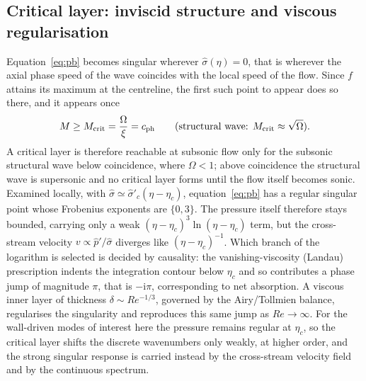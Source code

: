 \documentclass[11pt]{article}
\newcommand{\Om}{\Omega}
\begin{document}
\subsection{Critical layer: inviscid structure and viscous regularisation}
Equation~\eqref{eq:pb} becomes singular wherever $\hat\sigma(\eta)=0$, that is wherever the axial phase
speed of the wave coincides with the local speed of the flow. Since $f$ attains its maximum at the
centreline, the first such point to appear does so there, and it appears once
\begin{equation}
M\ge M_{\rm crit}=\frac{\Om}{\xi}=c_{\rm ph}\qquad(\text{structural wave: } M_{\rm crit}\approx\sqrt{\Om}).
\end{equation}
A critical layer is therefore reachable at subsonic flow only for the subsonic structural wave below
coincidence, where $\Om<1$; above coincidence the structural wave is supersonic and no critical layer
forms until the flow itself becomes sonic. Examined locally, with
$\hat\sigma\simeq\hat\sigma'_c(\eta-\eta_c)$, equation~\eqref{eq:pb} has a regular singular point whose
Frobenius exponents are $\{0,3\}$. The pressure itself therefore stays bounded, carrying only a weak
$(\eta-\eta_c)^3\ln(\eta-\eta_c)$ term, but the cross-stream velocity $v\propto\hat p'/\hat\sigma$
diverges like $(\eta-\eta_c)^{-1}$. Which branch of the logarithm is selected is decided by causality:
the vanishing-viscosity (Landau) prescription indents the integration contour below $\eta_c$ and so
contributes a phase jump of magnitude $\pi$, that is $-\mathrm{i}\pi$, corresponding to net absorption.
A viscous inner layer of thickness $\delta\sim Re^{-1/3}$, governed by the Airy/Tollmien balance,
regularises the singularity and reproduces this same jump as $Re\to\infty$. For the wall-driven modes
of interest here the pressure remains regular at $\eta_c$, so the critical layer shifts the discrete
wavenumbers only weakly, at higher order, and the strong singular response is carried instead by the
cross-stream velocity field and by the continuous spectrum.
\end{document}
